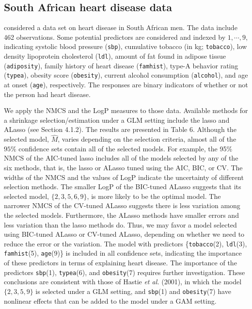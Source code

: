 \documentclass[12pt]{article} %
\theoremstyle{definition}
\begin{document}
\subsection{South African heart disease data}
\hspace{4mm}
\citet{Hastie2001} considered a data set on heart disease in South African men. The data include 462 observations. Some
potential predictors are considered and indexed by $1,\cdots,9$, indicating
systolic blood pressure (\texttt{sbp}), cumulative tobacco (in kg; \texttt{tobacco}), low density lipoprotein cholesterol (\texttt{ldl}), amount of fat found in adipose tissue (\texttt{adiposity}), family history of heart disease (\texttt{famhist}), type-A behavior rating (\texttt{typea}), obesity score (\texttt{obesity}), current alcohol consumption (\texttt{alcohol}), and age at onset (\texttt{age}), respectively. The responses are binary indicators of whether or not the person had heart disease. 

We apply the NMCS and the LogP measures to those data. Available methods for a shrinkage selection/estimation under a GLM setting include the lasso and ALasso (see Section 4.1.2). The results are presented in Table 6. Although the selected model, $\hat{M}$, varies depending on the selection criteria, almost all of the $95\%$ confidence sets contain all of the selected models. For example, the 95\% NMCS of the AIC-tuned lasso includes all of the models selected by any of the six methods, that is, the lasso or ALasso tuned using the AIC, BIC, or CV. The widths of the NMCS and the values of LogP indicate the uncertainty of different selection methods. The smaller LogP of the BIC-tuned ALasso suggests that its selected model, $\{2,3,5,6,9\}$, is more likely to be the optimal model. The narrower NMCS of the CV-tuned ALasso suggests there is less variation among the selected models. Furthermore, the ALasso methods have smaller errors and less variation than the lasso methods do. Thus, we may favor a model selected using BIC-tuned ALasso or CV-tuned ALasso, depending on whether we need to reduce the error or the variation.  The model with predictors \{\texttt{tobacco}(2), \texttt{ldl}(3), \texttt{famhist}(5), \texttt{age}(9)\} is included in all confidence sets, indicating the importance of these predictors in terms of explaining heart disease. The importance of the predictors \texttt{sbp}(1), \texttt{typea}(6), and \texttt{obesity}(7) requires further investigation. These conclusions are consistent with those of Hastie {\it et al.} (2001), in which the model $\{2, 3, 5, 9\}$ is selected under a GLM setting, and \texttt{sbp}(1) and \texttt{obesity}(7) have nonlinear effects that can be added to the model under a GAM setting.
\end{document}
